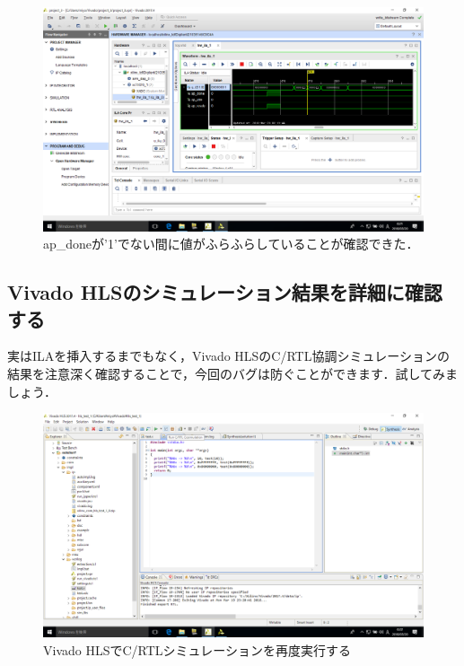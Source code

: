 \documentclass[a4paper,dvipdfmx]{jsarticle}
\begin{document}
 \begin{figure}[H]
  \begin{center}
   \includegraphics[width=.8\textwidth]{chapter08_figures/VirtualBox_Windows10_20_03_2018_00_22_19.png}
  \end{center}
  \caption{ap\_doneが'1'でない間に値がふらふらしていることが確認できた．}
 \end{figure}

 \subsection{Vivado HLSのシミュレーション結果を詳細に確認する}

実はILAを挿入するまでもなく，Vivado HLSのC/RTL協調シミュレーションの結果を注意深く確認することで，今回のバグは防ぐことができます．試してみましょう．

 \begin{figure}[H]
  \begin{center}
   \includegraphics[width=.8\textwidth]{chapter08_figures/VirtualBox_Windows10_20_03_2018_00_23_02.png}
  \end{center}
  \caption{Vivado HLSでC/RTLシミュレーションを再度実行する}
 \end{figure}
\end{document}
